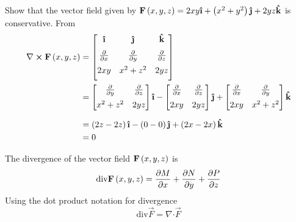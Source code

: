 \documentclass[openany]{memoir}
\begin{document}
\begin{mycode}
\begin{exmp}
Show that the vector field given by
$\nkvecfield{F}{x,y,z}=2xy\ihat+\nkpar{x^2+y^2}\jhat+2yz\khat$ is
conservative.
\nksolution
From 
\begin{align}
    \nabla \bm{\times} \nkvecfield{F}{x, y, z} &=
        \begin{bmatrix}
            \ihat & \jhat & \khat \\[0.6em]
            \frac{\partial}{\partial x} & \frac{\partial}{\partial y} & \frac{\partial}{\partial z} \\[0.6em]
            2xy & x^2+z^2 & 2yz \\[0.6em]
        \end{bmatrix} \\
    &=
        \begin{bmatrix}
            \frac{\partial}{\partial y} & \frac{\partial}{\partial z} \\[0.6em]
            x^2+z^2 & 2yz
        \end{bmatrix}\ihat
        -
        \begin{bmatrix}
            \frac{\partial}{\partial x} & \frac{\partial}{\partial z} \\[0.6em]
            2xy & 2yz
        \end{bmatrix}\jhat        
        +
        \begin{bmatrix}
            \frac{\partial}{\partial x} & \frac{\partial}{\partial y} \\[0.6em]
            2xy & x^2 + z^2
        \end{bmatrix}\khat \\[0.6em]
    &= \nkpar{2z-2z}\ihat - \nkpar{0-0}\jhat + \nkpar{2x-2x}\khat \\
    &= 0
\end{align}
\end{exmp}
\end{mycode}

The divergence of the vector field $\mathbf{F}\left(x, y, z\right)$ is
\begin{equation}
    \mathrm{div} \mathbf{F}\left(x,y,z\right)=
    \frac{\partial M}{\partial x} + \frac{\partial N}{\partial y} + \frac{\partial P}{\partial z}\label{eq:divergence}
\end{equation}
Using the dot product notation for divergence
\begin{equation}
    \mathrm{div}\vec{F} = \nabla \bm{\cdot} \vec{F}
\end{equation}
\end{document}
